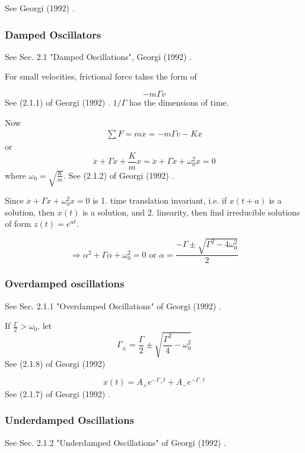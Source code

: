 \documentclass[10pt]{amsart}
\begin{document}
\begin{multicols*}{2}
See Georgi (1992) \cite{Geor1992}.

\subsubsection{Damped Oscillators}

See Sec. 2.1 "Damped Oscillations", Georgi (1992) \cite{Geor1992}.

For small velocities, frictional force takes the form of

\begin{equation}
	-m\Gamma v
\end{equation}
See (2.1.1) of Georgi (1992) \cite{Geor1992}. $1/\Gamma$ has the dimensions of time.

Now
\[
\begin{gathered}
	\sum F = m\ddot{x} = -m \Gamma v - Kx
\end{gathered}
\]
or
\begin{equation}
	\ddot{x} + \Gamma \dot{x} + \frac{K}{m} x = \ddot{x} + \Gamma \dot{x} + \omega_0^2 x = 0
\end{equation}
where $\omega_0 = \sqrt{ \frac{K}{m} }$. See (2.1.2) of Georgi (1992) \cite{Geor1992}.

Since $\ddot{x} + \Gamma \dot{x} + \omega_0^2 x = 0$ is 1. time translation invariant, i.e. if $x(t+a)$ is a solution, then $x(t)$ is a solution, and 2. linearity, then find irreducible solutions of form $z(t) = e^{\alpha t}$.

\[
\Longrightarrow \alpha^2 + \Gamma \alpha + \omega_0^2 =0 \text{ or } \alpha = \frac{ -\Gamma \pm \sqrt{ \Gamma^2 - 4\omega_0^2}}{2}
\]

\subsubsection{Overdamped oscillations} See Sec. 2.1.1 "Overdamped Oscillations" of Georgi (1992) \cite{Geor1992}.

If $\frac{\Gamma}{2} > \omega_0$, let
\begin{equation}
	\Gamma_{\pm} = \frac{\Gamma}{2} \pm \sqrt{ \frac{\Gamma^2}{4} - \omega_0^2}
\end{equation}
See (2.1.8) of Georgi (1992) \cite{Geor1992}

\begin{equation}
	x(t) = A_+ e^{-\Gamma_+ t} + A_- e^{-\Gamma_- t}
\end{equation}
See (2.1.7) of Georgi (1992) \cite{Geor1992}.

\subsubsection{Underdamped Oscillations} See Sec. 2.1.2 "Underdamped Oscillations" of Georgi (1992) \cite{Geor1992}.


\end{multicols*}
\end{document}
